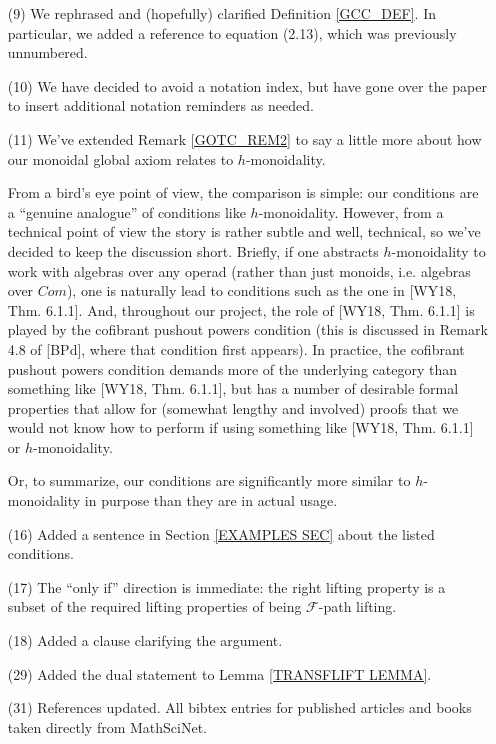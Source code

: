 \documentclass[a4paper,10pt
]{article}%
\numberwithin{equation}{section}
\numberwithin{figure}{section}
\theoremstyle{definition} %
\newcommand{\F}{\ensuremath{\mathcal F}}
\newcommand{\1}{\ensuremath{\mathbbm 1}}%
\begin{document}
\begin{enumerate}
\item[(9)] We rephrased and (hopefully) clarified Definition \ref{GCC_DEF}. In particular, we added a reference to equation (2.13), which was previously unnumbered.
\item[(10)] We have decided to avoid a notation index, but have gone over the paper to insert additional notation reminders as needed.
\item[(11)] We've extended Remark \ref{GOTC_REM2} to say a little more about how our monoidal global axiom relates to 
$h$-monoidality.

From a bird's eye point of view, the comparison is simple: our conditions are a ``genuine analogue'' of conditions like $h$-monoidality. 
However, from a technical point of view the story is rather subtle and well, technical, so we've decided to keep the discussion short. 
Briefly, if one abstracts $h$-monoidality to work with 
algebras over any operad (rather than just monoids, i.e. algebras over $Com$), 
one is naturally lead to conditions such as the one
in [WY18, Thm. 6.1.1].
And, throughout our project, the role of [WY18, Thm. 6.1.1]
is played by the cofibrant pushout powers condition
(this is discussed in Remark 4.8 of [BPd], where that condition first appears).
In practice, the cofibrant pushout powers condition demands more of the underlying category than something like [WY18, Thm. 6.1.1],
but has a number of desirable formal properties that allow
for (somewhat lengthy and involved) proofs that we would not 
know how to perform if using something like 
[WY18, Thm. 6.1.1] or
$h$-monoidality.

Or, to summarize, our conditions are significantly more similar to 
$h$-monoidality in purpose than they are in actual usage.


\item[(16)] Added a sentence in Section \ref{EXAMPLES SEC} about the listed conditions.
\item[(17)] The ``only if'' direction is immediate: the right lifting property is a subset of the required lifting properties of being $\F$-path lifting.
\item[(18)] Added a clause clarifying the argument.
\item[(29)] Added the dual statement to Lemma \ref{TRANSFLIFT LEMMA}.
\item[(31)] References updated. All bibtex entries for published articles and books taken directly from MathSciNet.

\end{enumerate}
\end{document}
